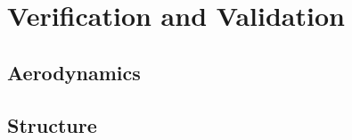 \section{Verification and Validation}

\subsection{Aerodynamics} \label{sec:VandVaero}


\subsection{Structure} \label{sec:VandVstruc}




